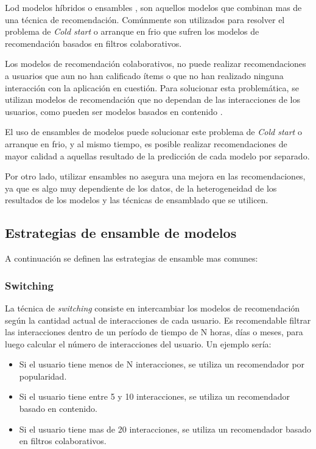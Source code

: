 \documentclass[11pt,a4paper,twoside]{thesis}
\begin{document}
Lod modelos híbridos o ensambles \cite{criado2018analisis, falk2019practical},
son aquellos modelos que combinan mas de una técnica de recomendación.
Comúnmente son utilizados para resolver el problema de \textit{Cold start} o
arranque en frio que sufren los modelos de recomendación basados en filtros
colaborativos.

Los modelos de recomendación colaborativos, no puede realizar recomendaciones a
usuarios que aun no han calificado ítems o que no han realizado ninguna
interacción con la aplicación en cuestión. Para solucionar esta problemática,
se utilizan modelos de recomendación que no dependan de las interacciones de
los usuarios, como pueden ser modelos basados en contenido
\cite{glauber2019collaborative}.

El uso de ensambles de modelos puede solucionar este problema de \textit{Cold
	start} o arranque en frio, y al mismo tiempo, es posible realizar
recomendaciones de mayor calidad a aquellas resultado de la predicción de cada
modelo por separado.

Por otro lado, utilizar ensambles no asegura una mejora en las recomendaciones,
ya que es algo muy dependiente de los datos, de la heterogeneidad de los
resultados de los modelos y las técnicas de ensamblado que se utilicen.

\subsection{Estrategias de ensamble de modelos}

A continuación se definen las estrategias de ensamble mas comunes:

\subsubsection{Switching}

La técnica de \textit{switching} consiste en intercambiar los modelos de
recomendación según la cantidad actual de interacciones de cada usuario. Es
recomendable filtrar las interacciones dentro de un período de tiempo de N
horas, días o meses, para luego calcular el número de interacciones del
usuario. Un ejemplo sería:

\begin{itemize}
	\item Si el usuario tiene menos de N interacciones, se utiliza un recomendador por
	      popularidad.
	\item Si el usuario tiene entre 5 y 10 interacciones, se utiliza un recomendador
	      basado en contenido.
	\item Si el usuario tiene mas de 20 interacciones, se utiliza un recomendador basado
	      en filtros colaborativos.
\end{itemize}
\end{document}
